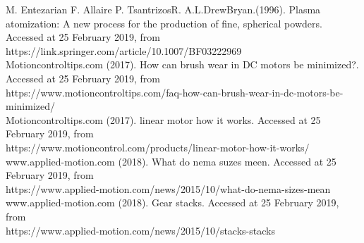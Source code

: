 \documentclass[11pt]{article}
\begin{document}
	
	    M. Entezarian F. Allaire P. TsantrizosR. A.L.DrewBryan.(1996). Plasma atomization: A new process for the production of fine, spherical powders. Accessed at 25 February 2019, from \\ 
	https://link.springer.com/article/10.1007/BF03222969\\
	
		Motioncontroltips.com (2017).  How can brush wear in DC motors be minimized?. Accessed at 25 February 2019, from \\ 
	https://www.motioncontroltips.com/faq-how-can-brush-wear-in-dc-motors-be-minimized/\\
	
	
		Motioncontroltips.com (2017).  linear motor how it works. Accessed at 25 February 2019, from \\ 	
	https://www.motioncontrol.com/products/linear-motor-how-it-works/\\
	
	www.applied-motion.com (2018). What do nema suzes meen. Accessed at 25 February 2019, from \\ 
     https://www.applied-motion.com/news/2015/10/what-do-nema-sizes-mean\\
	
	www.applied-motion.com (2018). Gear stacks. Accessed at 25 February 2019, from \\ 
	https://www.applied-motion.com/news/2015/10/stacks-stacks
	
	
\end{document}
